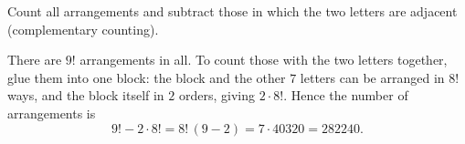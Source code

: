 Count all arrangements and subtract those in which the two letters are adjacent (complementary counting).

There are $9!$ arrangements in all. To count those with the two letters together, glue them into one block: the block and the other $7$ letters can be arranged in $8!$ ways, and the block itself in $2$ orders, giving $2\cdot8!$. Hence the number of arrangements is
\[
9!-2\cdot8!=8!\,(9-2)=7\cdot40320=\boxed{282240}.
\]
